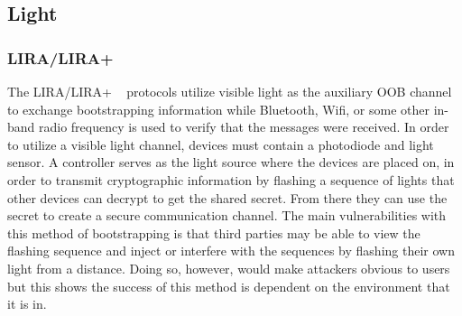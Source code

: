 \subsection{Light}
\subsubsection{LIRA/LIRA+}
The LIRA/LIRA+ ~\cite{kovavcevic2016flashing} protocols utilize visible light as the auxiliary OOB channel to exchange bootstrapping information while Bluetooth, Wifi, or some other in-band radio frequency is used to verify that the messages were received. In order to utilize a visible light channel, devices must contain a photodiode and light sensor. A controller serves as the light source where the devices are placed on, in order to transmit cryptographic information by flashing a sequence of lights that other devices can decrypt to get the shared secret. From there they can use the secret to create a secure communication channel. The main vulnerabilities with this method of bootstrapping is that third parties may be able to view the flashing sequence and inject or interfere with the sequences by flashing their own light from a distance. Doing so, however, would make attackers obvious to users but this shows the success of this method is dependent on the environment that it is in.
